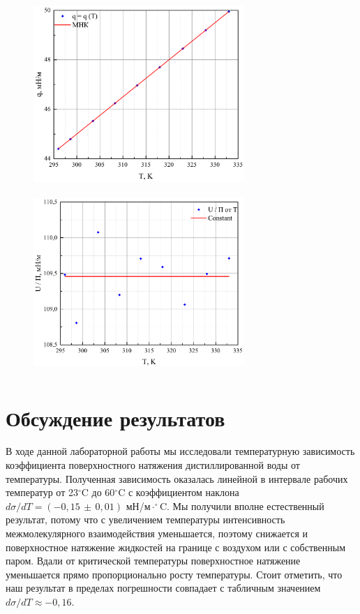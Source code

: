 \documentclass[a4paper,12pt]{article} %
\begin{document}
	
	\begin{figure}[h!]
		\begin{floatrow}
			{\includegraphics[width=8cm,height=7cm]{Graph_2}}
			{\includegraphics[width=8cm,height=7cm]{Graph_3}}         
		\end{floatrow}
	\end{figure}

\newpage
\section*{Обсуждение результатов}
	В ходе данной лабораторной работы мы исследовали температурную зависимость коэффициента поверхностного натяжения дистиллированной воды от температуры. Полученная зависимость оказалась линейной в интервале рабочих температур от 23$^\circ$C до 60$^\circ$C с коэффициентом наклона $d\sigma / dT = (-0,15\,\pm\, 0,01)$  мН/м$\cdot^\circ$C. Мы получили вполне естественный результат, потому что с увеличением температуры интенсивность межмолекулярного взаимодействия уменьшается, поэтому снижается и поверхностное натяжение жидкостей на границе с воздухом или с собственным паром. Вдали от критической температуры поверхностное натяжение уменьшается прямо пропорционально росту температуры. Стоит отметить, что наш результат в пределах погрешности совпадает с табличным значением $d\sigma / dT \approx -0,16$.
	
\end{document}
